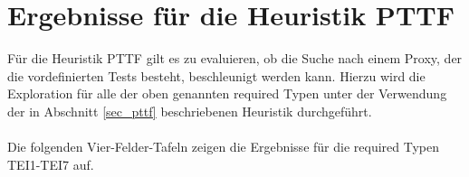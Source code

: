 \section{Ergebnisse für die Heuristik PTTF}\label{sec_evalPTTF}
Für die Heuristik PTTF gilt es zu evaluieren, ob die Suche nach einem Proxy, der die vordefinierten Tests besteht, beschleunigt werden kann. Hierzu wird die Exploration für alle der oben genannten required Typen unter der Verwendung der in Abschnitt \ref{sec_pttf} beschriebenen Heuristik durchgeführt.
\\\\
Die folgenden Vier-Felder-Tafeln zeigen die Ergebnisse für die required Typen TEI1-TEI7 auf.
\begin{multicols}{3}
\end{multicols}
\pagebreak
\begin{multicols}{2}
\end{multicols}

\begin{multicols}{2}
\end{multicols}


